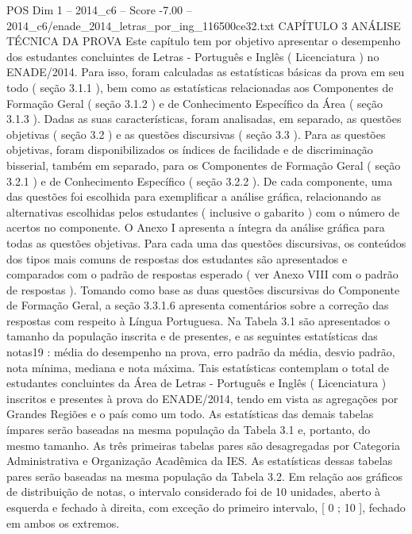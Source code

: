 \begin{textsample}{POS Dim 1 – 2014\_c6 – Score -7.00 – 2014\_c6/enade\_2014\_letras\_por\_ing\_116500ce32.txt}  \label{ex:f1_pos_425}
CAPÍTULO 3 ANÁLISE TÉCNICA DA PROVA Este capítulo tem por objetivo apresentar o desempenho dos estudantes concluintes de Letras - Português e Inglês ( Licenciatura ) no ENADE/2014.
Para isso, foram calculadas as estatísticas básicas da prova em seu todo ( seção 3.1.1 ), bem como as estatísticas relacionadas aos Componentes de Formação Geral ( seção 3.1.2 ) e de Conhecimento Específico da Área ( seção 3.1.3 ).
Dadas as suas características, foram analisadas, em separado, as questões objetivas ( seção 3.2 ) e as questões discursivas ( seção 3.3 ).
Para as questões objetivas, foram disponibilizados os índices de facilidade e de discriminação bisserial, também em separado, para os Componentes de Formação Geral ( seção 3.2.1 ) e de Conhecimento Específico ( seção 3.2.2 ).
De cada componente, uma das questões foi escolhida para exemplificar a análise gráfica, relacionando as alternativas escolhidas pelos estudantes ( inclusive o gabarito ) com o número de acertos no componente.
O Anexo I apresenta a íntegra da análise gráfica para todas as questões objetivas.
Para cada uma das questões discursivas, os conteúdos dos tipos mais comuns de respostas dos estudantes são apresentados e comparados com o padrão de respostas esperado ( ver Anexo VIII com o padrão de respostas ).
Tomando como base as duas questões discursivas do Componente de Formação Geral, a seção 3.3.1.6 apresenta comentários sobre a correção das respostas com respeito à Língua Portuguesa.
Na Tabela 3.1 são apresentados o tamanho da população inscrita e de presentes, e as seguintes estatísticas das notas19 : média do desempenho na prova, erro padrão da média, desvio padrão, nota mínima, mediana e nota máxima.
Tais estatísticas contemplam o total de estudantes concluintes da Área de Letras - Português e Inglês ( Licenciatura ) inscritos e presentes à prova do ENADE/2014, tendo em vista as agregações por Grandes Regiões e o país como um todo.
As estatísticas das demais tabelas ímpares serão baseadas na mesma população da Tabela 3.1 e, portanto, do mesmo tamanho.
As três primeiras tabelas pares são desagregadas por Categoria Administrativa e Organização Acadêmica da IES.
As estatísticas dessas tabelas pares serão baseadas na mesma população da Tabela 3.2.
Em relação aos gráficos de distribuição de notas, o intervalo considerado foi de 10 unidades, aberto à esquerda e fechado à direita, com exceção do primeiro intervalo, [ 0 ; 10 ], fechado em ambos os extremos.

\end{textsample}
